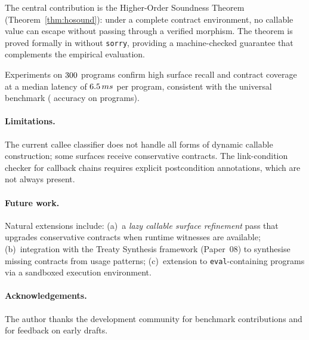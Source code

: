 \documentclass[11pt]{article}
\begin{document}
The central contribution is the Higher-Order Soundness Theorem
(Theorem~\ref{thm:hosound}): under a complete contract environment,
no callable value can escape without passing through a verified
morphism.  The theorem is proved formally in \LEAN{} without
\texttt{sorry}, providing a machine-checked guarantee that complements
the empirical evaluation.

Experiments on $300{}$ programs confirm high surface recall
and contract coverage at a median latency of $6.5\,ms{}$
per program, consistent with the universal benchmark (\expAccuracy{}
accuracy on \expTotalPrograms{} programs).

\paragraph{Limitations.}
The current callee classifier does not handle all forms of dynamic
callable construction; some surfaces receive conservative
contracts.  The link-condition checker for callback chains requires
explicit postcondition annotations, which are not always present.

\paragraph{Future work.}
Natural extensions include: (a)~a \emph{lazy callable surface
refinement} pass that upgrades conservative contracts when runtime
witnesses are available; (b)~integration with the Treaty Synthesis
framework (Paper~08) to synthesise missing contracts from usage
patterns; (c)~extension to \texttt{eval}-containing programs via
a sandboxed execution environment.

\paragraph{Acknowledgements.}
The author thanks the \JuGeo{} development community for benchmark
contributions and for feedback on early drafts.
\end{document}
